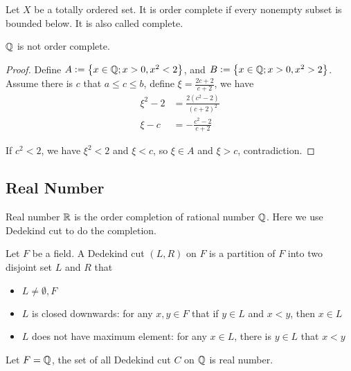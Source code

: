 \begin{definition}
    Let $X$ be a totally ordered set. It is order complete if every nonempty subset is bounded below. It is also called complete.
\end{definition}


\begin{theorem}
    $\mathbb{Q}$ is not order complete.
\end{theorem}
\begin{proof}
    Define $A:=\set{x \in \mathbb{Q}; x > 0 , x^2 < 2}$, and $B:=\set{x \in \mathbb{Q}; x > 0, x^2 > 2}$. Assume there is $c$ that $a \leq c \leq b$, define $\xi = \frac{2c+2}{c+2}$, we have
    \begin{equation}
        \begin{aligned}
            \xi^2 - 2 &= \frac{2(c^2 -2)}{(c+2)^2} \\
            \xi - c &= - \frac{c^2 -2}{c+2}    
        \end{aligned}      
    \end{equation}
    
    If $c^2 < 2$, we have $\xi^2 < 2$ and $\xi < c$, so $\xi \in A$ and $\xi > c$, contradiction.
\end{proof}


\subsection{Real Number}

Real number $\mathbb{R}$ is the order completion of rational number $\mathbb{Q}$. Here we use Dedekind cut to do the completion.

\begin{definition}
    Let $F$ be a field. A Dedekind cut $(L,R)$ on $F$ is a partition of $F$ into two disjoint set $L$ and $R$ that
    \begin{itemize}
        \item $L \neq \emptyset, F$
        \item $L$ is closed downwards: for any $x,y \in F$ that if $y \in L$ and $x < y$, then $x \in L$
        \item $L$ does not have maximum element: for any $x \in L$, there is $y\in L$ that $x < y$
    \end{itemize}
\end{definition}

Let $F=\mathbb{Q}$, the set of all Dedekind cut $C$ on $\mathbb{Q}$ is real number.

